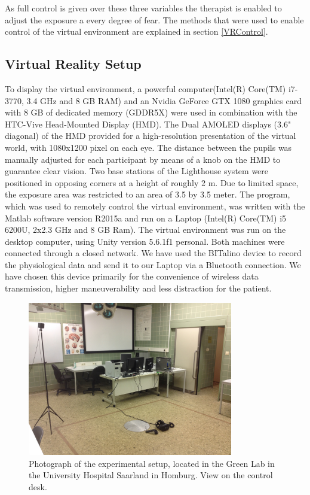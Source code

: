 As full control is given over these three variables the therapist is enabled to adjust the exposure a every degree of fear. 
The methods that were used to enable control of the virtual environment are explained in section \ref{VRControl}.

\subsection{Virtual Reality Setup}
To display the virtual environment, a powerful computer(Intel(R) Core(TM) i7-3770, 3.4 GHz and 8 GB RAM) and an Nvidia GeForce GTX 1080 graphics card with 8 GB of dedicated memory (GDDR5X) were used in combination with the HTC-Vive Head-Mounted Display (HMD). The Dual AMOLED displays (3.6" diagonal) of the HMD provided for a high-resolution presentation of the virtual world, with 1080x1200 pixel on each eye. The distance between the pupils was manually adjusted for each participant by means of a knob on the HMD to guarantee clear vision. 
Two base stations of the Lighthouse system were positioned in opposing corners at a height of roughly 2 m. Due to limited space, the exposure area was restricted to an area of 3.5 by 3.5 meter. The program, which was used to remotely control the virtual environment, was written with the Matlab software version R2015a and run on a Laptop (Intel(R) Core(TM) i5 6200U, 2x2.3 GHz and 8 GB Ram). The virtual environment was run on the desktop computer, using Unity version 5.6.1f1 personal. Both machines were connected through a closed network. We have used the BITalino device to record the physiological data and send it to our Laptop via a Bluetooth connection. We have chosen this device primarily for the convenience of wireless data transmission, higher maneuverability and less distraction for the patient. 

\begin{figure}[h]
\centering
\includegraphics[width=0.8\textwidth]{images/IMG_5311.JPG}
\caption{Photograph of the experimental setup, located in the Green Lab in the University Hospital Saarland in Homburg. View on the control desk.}
\label{SetupVRImg}
\end{figure}


